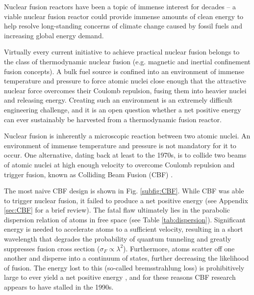 \documentclass[onecolumn,
               superscriptaddress,
               floatfix,
               longbibliography, 
               showkeys,apl]{revtex4-2}
\begin{document}
Nuclear fusion reactors have been a topic of immense interest for decades -- a viable nuclear fusion reactor could provide immense amounts of clean energy to help resolve long-standing concerns of climate change caused by fossil fuels and increasing global energy demand.

Virtually every current initiative to achieve practical nuclear fusion belongs to the class of thermodynamic nuclear fusion (e.g. magnetic and inertial confinement fusion concepts). A bulk fuel source is confined into an environment of immense temperature and pressure to force atomic nuclei close enough that the attractive nuclear force overcomes their Coulomb repulsion, fusing them into heavier nuclei and releasing energy. Creating such an environment is an extremely difficult engineering challenge, and it is an open question whether a net positive energy can ever sustainably be harvested from a thermodynamic fusion reactor.

Nuclear fusion is inherently a microscopic reaction between two atomic nuclei. An environment of immense temperature and pressure is not mandatory for it to occur. One alternative, dating back at least to the 1970s, is to collide two beams of atomic nuclei at high enough velocity to overcome Coulomb repulsion and trigger fusion, known as Colliding Beam Fusion (CBF) \cite{MAGLICH1973213,MAGLICH1975IEEE,blewett197xcbf}. 

The most naive CBF design is shown in Fig. \ref{subfig:CBF}. While CBF was able to trigger nuclear fusion, it failed to produce a net positive energy (see Appendix \ref{sec:CBF} for a brief review). The fatal flaw ultimately lies in the parabolic dispersion relation of atoms in free space (see Table \ref{tab:dispersion}). Significant energy is needed to accelerate atoms to a sufficient velocity, resulting in a short wavelength that degrades the probability of quantum tunneling and greatly suppresses fusion cross section ($\sigma_F \propto \lambda^2$). Furthermore, atoms scatter off one another and disperse into a continuum of states, further decreasing the likelihood of fusion. The energy lost to this (so-called bremsstrahlung loss) is prohibitively large to ever yield a net positive energy \cite{Ridder1994}, and for these reasons CBF research appears to have stalled in the 1990s.
\end{document}
